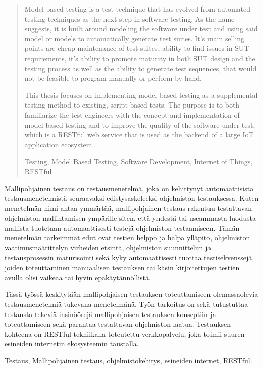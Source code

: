 \documentclass[a4paper, 12pt,titlepage]{dithesis}
\begin{document}

\begin{abstract}
Model-based testing is a test technique that has evolved from automated testing techniques as the next step in software testing.  As the name suggests, it is built around modeling the software under test and using said model or models to automatically generate test suites. It's main selling points are cheap maintenance of test suites, ability to find issues in SUT requirements, it's ability to promote maturity in both SUT design and the testing process as well as the ability to generate test sequences, that would not be feasible to program manually or perform by hand. 

This thesis focuses on implementing model-based testing as a supplemental testing method to existing, script based tests. The purpose is to both familiarize the test engineers with the concept and implementation of model-based testing and to improve the quality of the software under test, which is a RESTful web service that is used as the backend of a large IoT application ecosystem.

\keywords Testing, Model Based Testing, Software Development, Internet of Things, RESTful

\end{abstract}

\begin{tiivistelma}
Mallipohjainen testaus on testausmenetelmä, joka on kehittynyt automaattisista testausmenetelmistä seuraavaksi edistysaskeleeksi ohjelmiston testauksessa. Kuten menetelmän nimi antaa ymmärtää, mallipohjainen testaus rakentuu testattavan ohjelmiston mallintamisen ympärille siten, että yhdestä tai useammasta luodusta mallista tuotetaan automaattisesti testejä ohjelmiston testaamiseen. Tämän menetelmän tärkeimmät edut ovat testien helppo ja halpa ylläpito, ohjelmiston vaatimusmäärittelyn virheiden etsintä, ohjelmiston suunnittelun ja testausprosessin maturisointi sekä kyky automaattisesti tuottaa testisekvenssejä, joiden toteuttaminen manuaalisen testauksen tai käsin kirjoitettujen testien avulla olisi vaikeaa tai hyvin epäkäytännöllistä. 

Tässä työssä keskitytään mallipohjaisen testauksen toteuttamiseen olemassaolevia testausmenetelmiä tukevana menetelmänä. Työn tarkoitus on sekä tutustuttaa testausta tekeviä insinöörejä mallipohjaisen testauksen konseptiin ja toteuttamiseen sekä parantaa testattavan ohjelmiston laatua. Testauksen kohteena on RESTful tekniikalla toteutettu verkkopalvelu, joka toimii suuren esineiden internetin ekosysteemin taustalla.

\avainsanat Testaus, Mallipohjainen testaus, ohjelmistokehitys, esineiden internet, RESTful.
\end{tiivistelma}
\end{document}
